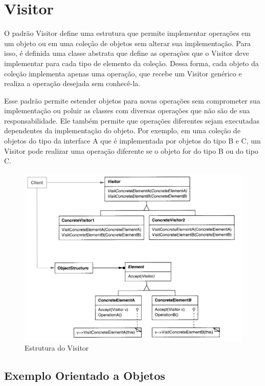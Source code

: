 \section{Visitor}

O padrão Visitor define uma estrutura que permite implementar 
operações em um objeto ou em uma coleção de objetos sem 
alterar sua implementação. Para isso, é definida uma classe 
abstrata que define as operações que o Visitor deve implementar 
para cada tipo de elemento da coleção. Dessa forma, cada 
objeto da coleção implementa apenas uma operação, que recebe 
um Visitor genérico e realiza a operação desejada sem 
conhecê-la.

Esse padrão permite estender objetos para novas operações 
sem comprometer sua implementação ou poluir as classes com 
diversas operações que não são de sua responsabilidade. Ele 
também permite que operações diferentes sejam executadas 
dependentes da implementação do objeto. Por exemplo, em uma 
coleção de objetos do tipo da interface A que é implementada 
por objetos do tipo B e C, um Visitor pode realizar uma 
operação diferente se o objeto for do tipo B ou do tipo C.

\begin{figure}[htb]
	\caption{\label{visitor_struct}Estrutura do Visitor}
	\begin{center}
	    \includegraphics[scale=0.3]{5_padroes-contexto-funcional/5.3_comportamentais/5.3.11_visitor/diagram.png}
	\end{center}
\end{figure}

\subsection*{Exemplo Orientado a Objetos}

